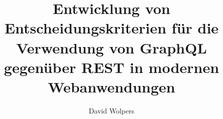 \documentclass[german]{htwg-report}
\begin{document}
\frontmatter



\title[Entwicklung von Entscheidungskriterien für die Verwendung von GraphQL gegenüber REST in modernen Webanwendungen]{Entwicklung von Entscheidungskriterien für die Verwendung von GraphQL gegenüber REST in modernen Webanwendungen}

\author{David Wolpers}


\makecover[]
%          




\tableofcontents

\mainmatter
















\appendix

%

\printbibliography[heading=bibintoc]
\end{document}
